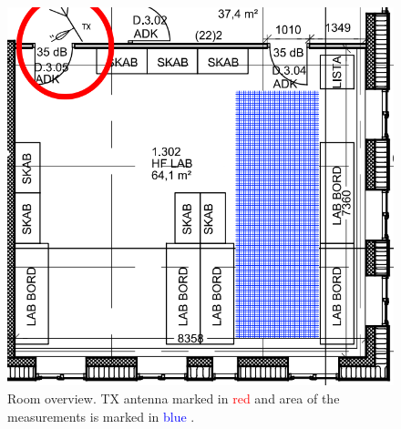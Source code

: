 \begin{figure}[H]
\begin{minipage}[H]{0.48\textwidth}
    \includegraphics[width=\textwidth]{figures/HFLABmarked.png}
    \caption{Room overview. TX antenna marked in \textcolor{red}{red} and area of the measurements is marked in \textcolor{blue}{blue} \citep{TX_antenna}.}
    \label{meas_area}
  \end{minipage}
\end{figure}

%
%
%


